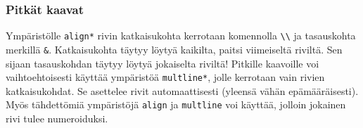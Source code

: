 \begin{frame}[fragile]
    \frametitle{Pitkät kaavat}
    Ympäristölle \Verb-align*- rivin katkaisukohta kerrotaan komennolla \verb-\\- ja tasauskohta merkillä \verb-&-. Katkaisukohta täytyy löytyä kaikilta, paitsi viimeiseltä riviltä. Sen sijaan tasauskohdan täytyy löytyä jokaiselta riviltä!
    \vaihto
    Pitkille kaavoille voi vaihtoehtoisesti käyttää ympäristöä \verb-multline*-, jolle kerrotaan vain rivien katkaisukohdat. Se asettelee rivit automaattisesti (yleensä vähän epämääräisesti).
    \vaihto
    Myös tähdettömiä ympäristöjä \verb-align- ja \verb-multline- voi käyttää, jolloin jokainen rivi tulee numeroiduksi.
\end{frame}
